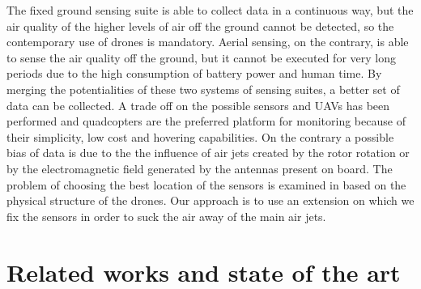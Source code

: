 The fixed ground sensing suite is able to collect data in a continuous way, but the air quality of the higher levels of air off the ground cannot be detected, so the contemporary use of drones is mandatory. Aerial sensing, on the contrary, is able to sense the air quality off the ground, but it cannot be executed for very long periods due to the high consumption of battery power and human time. By merging the potentialities of these two systems of sensing suites, a better set of data can be collected. A trade off on the possible sensors and UAVs has been performed and quadcopters are the preferred platform for monitoring because of their simplicity, low cost and hovering capabilities. On the contrary a possible bias of data is due to the the influence of air jets created by the rotor rotation or by the electromagnetic field generated by the antennas present on board. The problem of choosing the best location of the sensors is examined in \cite{8453584} based on the physical structure of the drones. Our approach is to use an extension on which we fix the sensors in order to suck the air away of the main air jets.
\section{Related works and state of the art}
